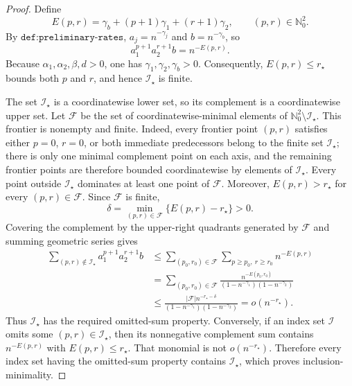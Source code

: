 \documentclass{article}
\begin{document}
\begin{proof}
Define
\[
E(p,r)=\gamma_b+(p+1)\gamma_1+(r+1)\gamma_2,
\qquad (p,r)\in\mathbb N_0^2.
\]
By \(\texttt{def:preliminary-rates}\), \(a_j=n^{-\gamma_j}\) and \(b=n^{-\gamma_b}\), so
\[
a_1^{p+1}a_2^{r+1}b=n^{-E(p,r)}.
\]
Because \(\alpha_1,\alpha_2,\beta,d>0\), one has \(\gamma_1,\gamma_2,\gamma_b>0\). Consequently, \(E(p,r)\le r_\star\) bounds both \(p\) and \(r\), and hence \(\mathcal I_\star\) is finite.

The set \(\mathcal I_\star\) is a coordinatewise lower set, so its complement is a coordinatewise upper set. Let \(\mathcal F\) be the set of coordinatewise-minimal elements of \(\mathbb N_0^2\setminus\mathcal I_\star\). This frontier is nonempty and finite. Indeed, every frontier point \((p,r)\) satisfies either \(p=0\), \(r=0\), or both immediate predecessors belong to the finite set \(\mathcal I_\star\); there is only one minimal complement point on each axis, and the remaining frontier points are therefore bounded coordinatewise by elements of \(\mathcal I_\star\). Every point outside \(\mathcal I_\star\) dominates at least one point of \(\mathcal F\). Moreover, \(E(p,r)>r_\star\) for every \((p,r)\in\mathcal F\). Since \(\mathcal F\) is finite,
\[
\delta=\min_{(p,r)\in\mathcal F}
\{E(p,r)-r_\star\}>0.
\]
Covering the complement by the upper-right quadrants generated by \(\mathcal F\) and summing geometric series gives
\[
\begin{aligned}
\sum_{(p,r)\notin\mathcal I_\star}a_1^{p+1}a_2^{r+1}b
&\le \sum_{(p_0,r_0)\in\mathcal F}
\sum_{p\ge p_0,\ r\ge r_0}n^{-E(p,r)}\\
&=\sum_{(p_0,r_0)\in\mathcal F}
\frac{n^{-E(p_0,r_0)}}{(1-n^{-\gamma_1})(1-n^{-\gamma_2})}\\
&\le \frac{|\mathcal F|n^{-r_\star-\delta}}
{(1-n^{-\gamma_1})(1-n^{-\gamma_2})}
=o(n^{-r_\star}).
\end{aligned}
\]
Thus \(\mathcal I_\star\) has the required omitted-sum property. Conversely, if an index set \(\mathcal I\) omits some \((p,r)\in\mathcal I_\star\), then its nonnegative complement sum contains \(n^{-E(p,r)}\) with \(E(p,r)\le r_\star\). That monomial is not \(o(n^{-r_\star})\). Therefore every index set having the omitted-sum property contains \(\mathcal I_\star\), which proves inclusion-minimality.


\end{proof}
\end{document}
